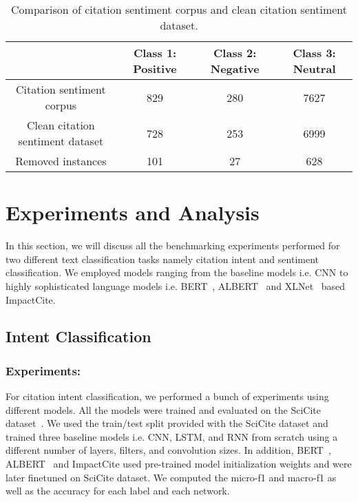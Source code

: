 \documentclass[runningheads]{llncs}
\begin{document}
\begin{table}[!t]
\renewcommand{\arraystretch}{1.3}
\caption{Comparison of citation sentiment corpus and clean citation sentiment dataset.}
\label{tab:scc_comparison}
\centering
\begin{tabular}{|c|c|c|c|}
\hline
 & Class 1: Positive & Class 2: Negative & Class 3: Neutral \\
\hline
Citation sentiment corpus & 829 & 280 & 7627 \\
\hline
Clean citation sentiment dataset & 728 & 253 & 6999 \\
\hline
Removed instances & 101 & 27 & 628 \\
\hline
\end{tabular}
\end{table}

\section{Experiments and Analysis}
In this section, we will discuss all the benchmarking experiments performed for two different text classification tasks namely citation intent and sentiment classification. We employed models ranging from the baseline models i.e. CNN to highly sophisticated language models i.e. BERT~\cite{devlin2018bert}, ALBERT~\cite{lan2019albert} and XLNet~\cite{yang2019xlnet} based ImpactCite.

\subsection{Intent Classification}

\subsubsection{Experiments:}
For citation intent classification, we performed a bunch of experiments using different models. All the models were trained and evaluated on the SciCite dataset~\cite{cohan2019structural}. We used the train/test split provided with the SciCite dataset and trained three baseline models i.e. CNN, LSTM, and RNN from scratch using a different number of layers, filters, and convolution sizes. In addition, BERT~\cite{devlin2018bert}, ALBERT~\cite{lan2019albert} and ImpactCite used pre-trained model initialization weights and were later finetuned on SciCite dataset. We computed the micro-f1 and macro-f1 as well as the accuracy for each label and each network.
\end{document}
